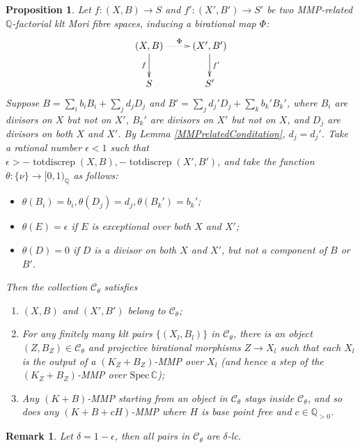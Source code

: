 \documentclass[11pt]{amsart}
\newtheorem{prop}[defn]{Proposition}
\newtheorem{rmk}[defn]{Remark}
\begin{document}
\begin{prop}\label{cat}
  Let $ f:(X,B)\to S$ and $f':(X',B')\to S' $ be two MMP-related $ \mathbb{Q} $-factorial klt Mori fibre spaces, inducing a birational map $\Phi$:
  \[ \xymatrix{
      (X,B)\ar[d]_f\ar@{.>}[r]^\Phi&(X',B')\ar[d]^{f'}\\
      S&S'} \]
  Suppose  $ B=\sum_ib_iB_i+\sum_jd_jD_j $ and $ B'=\sum_jd_j'D_j+\sum_kb_k'B_k' $, where $ B_i $ are divisors on $ X $ but not on $ X' $, $ B_k' $ are divisors on $ X' $ but not on $ X $, and $ D_j $ are divisors on both $ X $ and $ X' $. By Lemma \ref{MMPrelatedConditation}, $ d_j=d_j' $. Take a rational number $ \epsilon<1 $ such that $ \epsilon> -\operatorname{totdiscrep}(X,B),-\operatorname{totdiscrep}(X',B') $, and take the function $ \theta:\{\nu\}\to [0,1)_\mathbb{Q} $ as follows:
  \begin{itemize}
    \item $ \theta(B_i)=b_i, \theta(D_j)=d_j,\theta(B_k')=b_k'$;
    \item $ \theta(E)=\epsilon $ if $ E $ is exceptional over both $ X $ and $ X' $;
    \item $ \theta(D)=0 $ if $ D $ is a divisor on both $ X $ and $ X' $, but not a component of $ B $ or $ B' $.
  \end{itemize}
  Then the collection $ \mathcal{C}_\theta $ satisfies
  \begin{enumerate}
    \item $ (X,B) $ and $ (X',B') $ belong to $ \mathcal{C}_\theta $;
    \item For any finitely many klt pairs $ \{(X_l,B_l)\} $ in $ \mathcal{C}_\theta $, there is an object $ (Z,B_Z)\in \mathcal{C}_\theta $ and projective birational morphisms $ Z\to X_l $ such that each $X_l$ is the output of a  $ (K_{Z}+B_{Z}) $-MMP over $ X_l $ (and hence a step of the $(K_Z+B_Z)$-MMP over $ \mathrm{Spec}\,\mathbb{C} $);
    \item Any $ (K+B) $-MMP starting from an object in $ \mathcal{C}_\theta $ stays inside $ \mathcal{C}_\theta $, and so does any $ (K+B+cH) $-MMP where $ H $ is base point free and $ c\in \mathbb{Q}_{>0} $.
  \end{enumerate}
\end{prop}
\begin{rmk}\label{delta-lc}
  Let $\delta=1-\epsilon$, then all pairs in $\mathcal{C}_{\theta}$ are $\delta$-lc.
\end{rmk}
\end{document}
